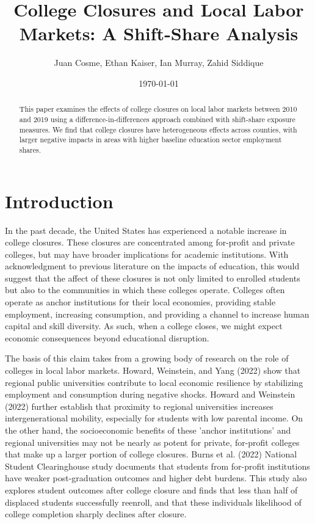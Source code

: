 \documentclass[12pt]{article}
\title{College Closures and Local Labor Markets: A Shift-Share Analysis}
\author{Juan Cosme, Ethan Kaiser, Ian Murray, Zahid Siddique }
\date{\today}
\begin{document}
\maketitle

\begin{abstract}
This paper examines the effects of college closures on local labor markets between 2010 and 2019 using a difference-in-differences approach combined with shift-share exposure measures. We find that college closures have heterogeneous effects across counties, with larger negative impacts in areas with higher baseline education sector employment shares.
\end{abstract}

\tableofcontents
\clearpage

\section{Introduction}

In the past decade, the United States has experienced a notable increase in college closures. These closures are concentrated among for-profit and private colleges, but may have broader implications for academic institutions. With acknowledgment to previous literature on the impacts of education, this would suggest that the affect of these closures is not only limited to enrolled students but also to the communities in which these colleges operate. Colleges often operate as anchor institutions for their local economies, providing stable employment, increasing consumption, and providing a channel to increase human capital and skill diversity. As such, when a college closes, we might expect economic consequences beyond educational disruption.

The basis of this claim takes from a growing body of research on the role of colleges in local labor markets. Howard, Weinstein, and Yang (2022) show that regional public universities contribute to local economic resilience by stabilizing employment and consumption during negative shocks. Howard and Weinstein (2022) further establish that proximity to regional universities increases intergenerational mobility, especially for students with low parental income. On the other hand, the socioeconomic benefits of these 'anchor institutions' and regional universities may not be nearly as potent for private, for-profit colleges that make up a larger portion of college closures. Burns et al. (2022) National Student Clearinghouse study documents that students from for-profit institutions have weaker post-graduation outcomes and higher debt burdens. This study also explores student outcomes after college closure and finds that less than half of displaced students successfully reenroll, and that these individuals likelihood of college completion sharply declines after closure.
\end{document}
